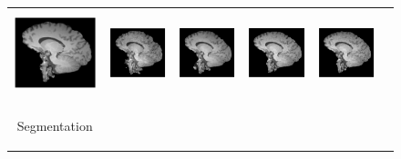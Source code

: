 \documentclass[review]{elsarticle}
\begin{document}
\begin{figure}[H]
\begin{raggedleft}
\begin{tabular}{cccccc}
			\includegraphics[width=2.5cm,height=2.5cm]{include/grp2/factor4/012-HH-1211-T1/012-HH-1211-T1_brains__35} &
			\includegraphics[width=2.5cm,height=2.5cm]{include/grp2/factor4/012-HH-1211-T1/012-HH-1211-T1_brains__zeroPadding_35} & \includegraphics[width=2.5cm,height=2.5cm]{include/grp2/factor4/012-HH-1211-T1/012-HH-1211-T1_brains__CS_35} & \includegraphics[width=2.5cm,height=2.5cm]{include/grp2/factor4/012-HH-1211-T1/012-HH-1211-T1_brains__IMCNNL2TUNE_35} & \includegraphics[width=2.5cm,height=2.5cm]{include/grp2/factor4/012-HH-1211-T1/012-HH-1211-T1_brains__predict_35}
			
			\tabularnewline
			
			\multirow{2}{0.05cm}[1.7cm]{\begin{turn}{90} {\footnotesize Segmentation} \end{turn}} &
			

\end{tabular}
\end{raggedleft}
\end{figure}
\end{document}
